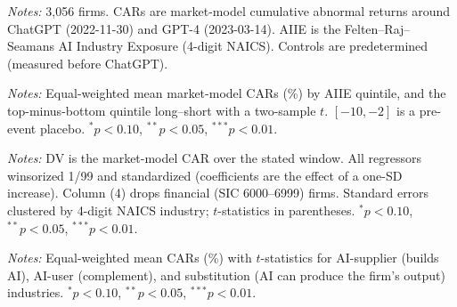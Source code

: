 \documentclass[12pt]{article}
\begin{document}
\FloatBarrier
\newpage
\begin{table}[htbp]\centering
\begin{threeparttable}
\caption{Summary statistics}\label{tab:sumstats}\small

\begin{tablenotes}\small\item \textit{Notes:} 3{,}056 firms. CARs are market-model
cumulative abnormal returns around ChatGPT (2022-11-30) and GPT-4 (2023-03-14). AIIE is
the Felten--Raj--Seamans AI Industry Exposure (4-digit NAICS). Controls are predetermined
(measured before ChatGPT).
\end{tablenotes}
\end{threeparttable}
\end{table}

\begin{table}[htbp]\centering
\begin{threeparttable}
\caption{AI-exposure quintile portfolios: mean CARs and long--short}\label{tab:longshort}\footnotesize
\setlength{\tabcolsep}{4.5pt}

\begin{tablenotes}\small\item \textit{Notes:} Equal-weighted mean market-model CARs (\%)
by AIIE quintile, and the top-minus-bottom quintile long--short with a two-sample $t$.
$[-10,-2]$ is a pre-event placebo. $^{*}p<0.10$, $^{**}p<0.05$, $^{***}p<0.01$.
\end{tablenotes}
\end{threeparttable}
\end{table}

\begin{table}[htbp]\centering
\begin{threeparttable}
\caption{Cross-sectional CAR regressions around ChatGPT}\label{tab:main}\small

\begin{tablenotes}\small\item \textit{Notes:} DV is the market-model CAR over the stated
window. All regressors winsorized 1/99 and standardized (coefficients are the effect of a
one-SD increase). Column (4) drops financial (SIC 6000--6999) firms. Standard errors
clustered by 4-digit NAICS industry; $t$-statistics in parentheses.
$^{*}p<0.10$, $^{**}p<0.05$, $^{***}p<0.01$.
\end{tablenotes}
\end{threeparttable}
\end{table}

\begin{table}[htbp]\centering
\begin{threeparttable}
\caption{The sign channel: mean CAR by AI-role bucket}\label{tab:buckets}\small

\begin{tablenotes}\small\item \textit{Notes:} Equal-weighted mean CARs (\%) with $t$-statistics
for AI-supplier (builds AI), AI-user (complement), and substitution (AI can produce the firm's
output) industries. $^{*}p<0.10$, $^{**}p<0.05$, $^{***}p<0.01$.
\end{tablenotes}
\end{threeparttable}
\end{table}
\end{document}
